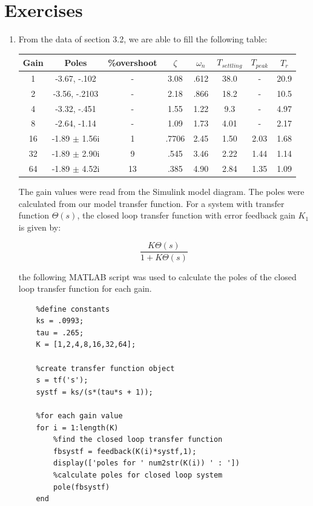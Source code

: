 \documentclass[11pt,a4paper]{article}
\begin{document}
\section{Exercises}
\begin{enumerate}

\item From the data of section 3.2, we are able to fill the following table:


\begin{center}
\begin{tabular}{|c|c|c|c|c|c|c|c|}
\hline
Gain & Poles & \%overshoot & $\zeta$ & $\omega_{n}$ & $T_{settling}$ & $T_{peak}$ & $T_{r}$ \\ \hline
1 & -3.67, -.102 & - & 3.08 & .612 & 38.0 & - & 20.9 \\ \hline 
2 & -3.56, -.2103 & - & 2.18 & .866 & 18.2 & - & 10.5 \\ \hline 
4 & -3.32, -.451 & - & 1.55 & 1.22  & 9.3 & - & 4.97 \\ \hline 
8 & -2.64, -1.14 & - & 1.09 & 1.73  & 4.01 & - & 2.17 \\ \hline 
16 & -1.89 $\pm$ 1.56i & 1 & .7706 & 2.45 & 1.50 & 2.03 & 1.68 \\ \hline 
32 & -1.89 $\pm$ 2.90i & 9 & .545 & 3.46 & 2.22 & 1.44 & 1.14 \\ \hline 
64 & -1.89 $\pm$ 4.52i & 13 & .385 & 4.90 & 2.84 & 1.35 & 1.09 \\ \hline 

\end{tabular}
\end{center}

The gain values were read from the Simulink model diagram. The poles were calculated from our model transfer function. For a system with transfer function $\Theta(s)$, the closed loop transfer function with error feedback gain $K_{1}$ is given by:

\begin{equation}
	\frac{K\Theta(s)}{1+K\Theta(s)}
\end{equation}

the following MATLAB script was used to calculate the poles of the closed loop transfer function for each gain.

\begin{verbatim}
	%define constants
	ks = .0993;
	tau = .265;
	K = [1,2,4,8,16,32,64];

	%create transfer function object
	s = tf('s');
	systf = ks/(s*(tau*s + 1));

	%for each gain value
	for i = 1:length(K)
		%find the closed loop transfer function
    	fbsystf = feedback(K(i)*systf,1);
    	display(['poles for ' num2str(K(i)) ' : '])
    	%calculate poles for closed loop system
    	pole(fbsystf)
	end
\end{verbatim}



\end{enumerate}
\end{document}
